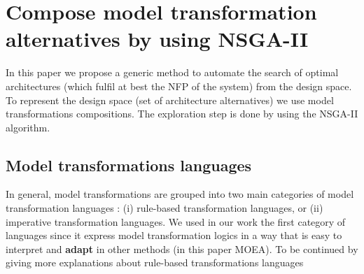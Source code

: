 \documentclass[conference]{IEEEtran}
\begin{document}
\section{Compose model transformation alternatives by using NSGA-II}
\label{Adapting}

In this paper we propose a generic method to automate the search of optimal architectures (which fulfil at best the NFP of the system) from the design space. To represent the design space (set of architecture alternatives) we use model transformations compositions. The exploration step is done by using the NSGA-II algorithm.

\subsection{Model transformations languages}
In general, model transformations are grouped into two main categories of model transformation languages : (i) rule-based transformation languages, or (ii)
imperative transformation languages. We used in our work the first category of languages since it express model transformation logics in a way that is easy to interpret and \textbf{adapt} in other methods (in this paper MOEA). To be continued by giving more explanations about rule-based transformations languages



\end{document}
